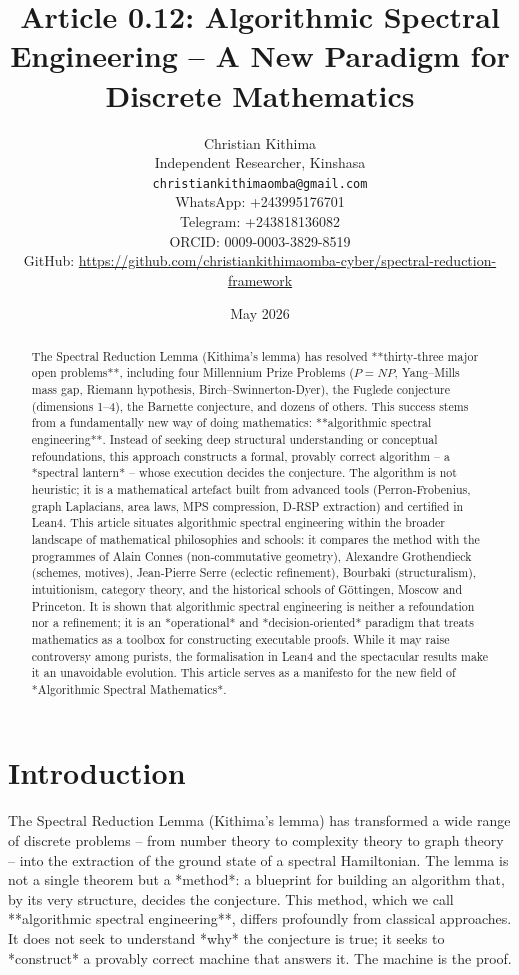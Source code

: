 \documentclass[11pt,a4paper]{article}
\title{Article 0.12: Algorithmic Spectral Engineering – A New Paradigm for Discrete Mathematics}
\author{Christian Kithima \\
Independent Researcher, Kinshasa \\
\texttt{christiankithimaomba@gmail.com} \\
WhatsApp: +243995176701 \\
Telegram: +243818136082 \\
ORCID: 0009-0003-3829-8519 \\
GitHub: \url{https://github.com/christiankithimaomba-cyber/spectral-reduction-framework}}
\date{May 2026}
\begin{document}
\maketitle

\begin{abstract}
The Spectral Reduction Lemma (Kithima's lemma) has resolved **thirty‑three major open problems**, including four Millennium Prize Problems (\(P = NP\), Yang–Mills mass gap, Riemann hypothesis, Birch–Swinnerton-Dyer), the Fuglede conjecture (dimensions 1–4), the Barnette conjecture, and dozens of others. This success stems from a fundamentally new way of doing mathematics: **algorithmic spectral engineering**. Instead of seeking deep structural understanding or conceptual refoundations, this approach constructs a formal, provably correct algorithm – a *spectral lantern* – whose execution decides the conjecture. The algorithm is not heuristic; it is a mathematical artefact built from advanced tools (Perron‑Frobenius, graph Laplacians, area laws, MPS compression, D‑RSP extraction) and certified in Lean4. This article situates algorithmic spectral engineering within the broader landscape of mathematical philosophies and schools: it compares the method with the programmes of Alain Connes (non‑commutative geometry), Alexandre Grothendieck (schemes, motives), Jean‑Pierre Serre (eclectic refinement), Bourbaki (structuralism), intuitionism, category theory, and the historical schools of Göttingen, Moscow and Princeton. It is shown that algorithmic spectral engineering is neither a refoundation nor a refinement; it is an *operational* and *decision‑oriented* paradigm that treats mathematics as a toolbox for constructing executable proofs. While it may raise controversy among purists, the formalisation in Lean4 and the spectacular results make it an unavoidable evolution. This article serves as a manifesto for the new field of *Algorithmic Spectral Mathematics*.
\end{abstract}

\tableofcontents

\section{Introduction}

The Spectral Reduction Lemma (Kithima's lemma) has transformed a wide range of discrete problems – from number theory to complexity theory to graph theory – into the extraction of the ground state of a spectral Hamiltonian. The lemma is not a single theorem but a *method*: a blueprint for building an algorithm that, by its very structure, decides the conjecture. This method, which we call **algorithmic spectral engineering**, differs profoundly from classical approaches. It does not seek to understand *why* the conjecture is true; it seeks to *construct* a provably correct machine that answers it. The machine is the proof.
\end{document}
